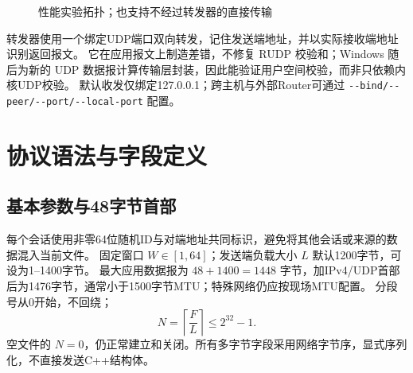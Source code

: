 \documentclass[UTF8,notitlepage,11pt]{ctexart}
\newcommand{\src}[1]{\nolinkurl{#1}}
\begin{document}
\begin{figure}[H]\centering
{}\caption{性能实验拓扑；也支持不经过转发器的直接传输}
\end{figure}

转发器使用一个绑定UDP端口双向转发，记住发送端地址，并以实际接收端地址识别返回报文。
它在应用报文上制造差错，不修复 RUDP 校验和；Windows 随后为新的 UDP 数据报计算传输层封装，因此能验证用户空间校验，而非只依赖内核UDP校验。
默认收发仅绑定127.0.0.1；跨主机与外部Router可通过 \src{--bind/--peer/--port/--local-port} 配置。

\section{协议语法与字段定义}\label{sec:wire}
\subsection{基本参数与48字节首部}
每个会话使用非零64位随机ID与对端地址共同标识，避免将其他会话或来源的数据混入当前文件。
固定窗口 $W\in[1,64]$；发送端负载大小 $L$ 默认1200字节，可设为1--1400字节。
最大应用数据报为 $48+1400=1448$ 字节，加IPv4/UDP首部后为1476字节，通常小于1500字节MTU；特殊网络仍应按现场MTU配置。
分段号从0开始，不回绕；
\[
N=\left\lceil\frac{F}{L}\right\rceil\le 2^{32}-1.
\]
空文件的 $N=0$，仍正常建立和关闭。所有多字节字段采用网络字节序，显式序列化，不直接发送C++结构体。
\end{document}
